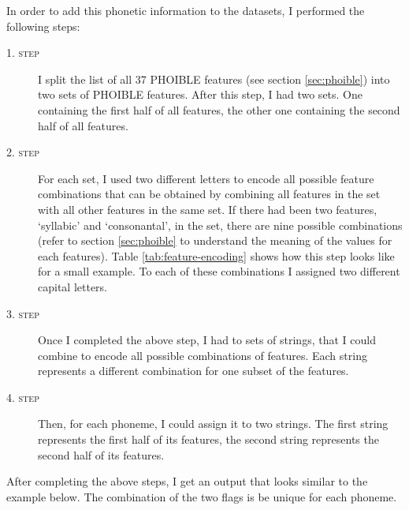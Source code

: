 In order to add this phonetic information to the datasets, I performed the following steps:
\begin{description}
    \item[\textsc{1. step}] I split the list of all 37 PHOIBLE features (see section \ref{sec:phoible}) into two sets of PHOIBLE features. After this step, I had two sets. One containing the first half of all features, the other one containing the second half of all features.
    \item[\textsc{2. step}] For each set, I used two different letters to encode all possible feature combinations that can be obtained by combining all features in the set with all other features in the same set. If there had been two features, `syllabic' and `consonantal', in the set, there are nine possible combinations (refer to section \ref{sec:phoible} to understand the meaning of the values for each features). Table \ref{tab:feature-encoding} shows how this step looks like for a small example.
    To each of these combinations I assigned two different capital letters.
    \item[\textsc{3. step}] Once I completed the above step, I had to sets of strings, that I could combine to encode all possible combinations of features. Each string represents a different combination for one subset of the features.
    \item[\textsc{4. step}] Then, for each phoneme, I could assign it to two strings. The first string represents the first half of its features, the second string represents the second half of its features.
\end{description}

After completing the above steps, I get an output that looks similar to the example below. The combination of the two flags is be unique for each phoneme.

